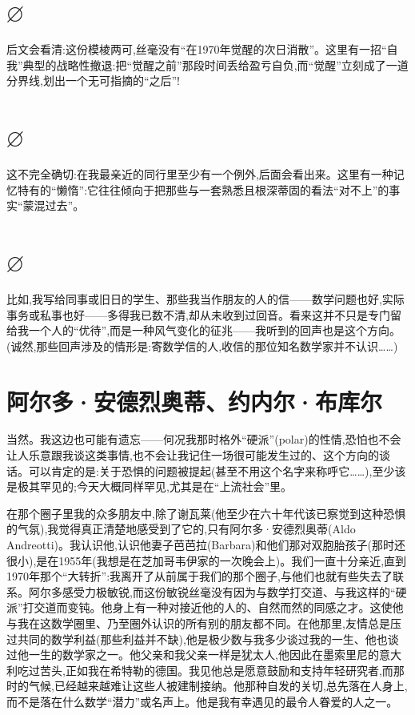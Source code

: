 \section{$\varnothing$}

后文会看清:这份模棱两可,丝毫没有“在1970年觉醒的次日消散”。这里有一招“自我”典型的战略性撤退:把“觉醒之前”那段时间丢给盈亏自负,而“觉醒”立刻成了一道分界线,划出一个无可指摘的“之后”!

\section{$\varnothing$}

这不完全确切:在我最亲近的同行里至少有一个例外,后面会看出来。这里有一种记忆特有的“懒惰”:它往往倾向于把那些与一套熟悉且根深蒂固的看法“对不上”的事实“蒙混过去”。

\section{$\varnothing$}

比如,我写给同事或旧日的学生、那些我当作朋友的人的信——数学问题也好,实际事务或私事也好——多得我已数不清,却从未收到过回音。看来这并不只是专门留给我一个人的“优待”,而是一种风气变化的征兆——我听到的回声也是这个方向。(诚然,那些回声涉及的情形是:寄数学信的人,收信的那位知名数学家并不认识……)

\section{阿尔多·安德烈奥蒂、约内尔·布库尔}

当然。我这边也可能有遗忘——何况我那时格外“硬派”(polar)的性情,恐怕也不会让人乐意跟我谈这类事情,也不会让我记住一场很可能发生过的、这个方向的谈话。可以肯定的是:关于恐惧的问题被提起(甚至不用这个名字来称呼它……),至少该是极其罕见的;今天大概同样罕见,尤其是在“上流社会”里。

在那个圈子里我的众多朋友中,除了谢瓦莱(他至少在六十年代该已察觉到这种恐惧的气氛),我觉得真正清楚地感受到了它的,只有阿尔多·安德烈奥蒂(Aldo Andreotti)。我认识他,认识他妻子芭芭拉(Barbara)和他们那对双胞胎孩子(那时还很小),是在1955年(我想是在芝加哥韦伊家的一次晚会上)。我们一直十分亲近,直到1970年那个“大转折”:我离开了从前属于我们的那个圈子,与他们也就有些失去了联系。阿尔多感受力极敏锐,而这份敏锐丝毫没有因为与数学打交道、与我这样的“硬派”打交道而变钝。他身上有一种对接近他的人的、自然而然的同感之才。这使他与我在这数学圈里、乃至圈外认识的所有别的朋友都不同。在他那里,友情总是压过共同的数学利益(那些利益并不缺),他是极少数与我多少谈过我的一生、他也谈过他一生的数学家之一。他父亲和我父亲一样是犹太人,他因此在墨索里尼的意大利吃过苦头,正如我在希特勒的德国。我见他总是愿意鼓励和支持年轻研究者,而那时的气候,已经越来越难让这些人被建制接纳。他那种自发的关切,总先落在人身上,而不是落在什么数学“潜力”或名声上。他是我有幸遇见的最令人眷爱的人之一。

